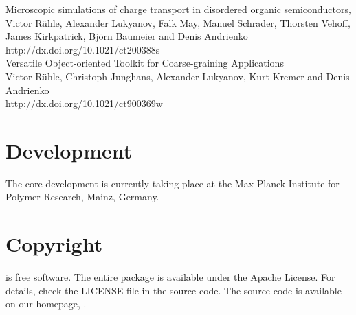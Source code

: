 \vspace{0.1cm}
\noindent
\cite{ruhle_microscopic_2011} Microscopic simulations of charge transport in disordered organic semiconductors, \\
Victor R\"uhle, Alexander Lukyanov, Falk May, Manuel Schrader, Thorsten Vehoff, James Kirkpatrick, Bj\"orn Baumeier and Denis Andrienko \\
{http://dx.doi.org/10.1021/ct200388s} \\

\vspace{0.1cm}
\noindent
\cite{ruhle_versatile_2009} Versatile Object-oriented Toolkit for Coarse-graining Applications \\
Victor R\"uhle, Christoph Junghans, Alexander Lukyanov, Kurt Kremer and Denis Andrienko \\
{http://dx.doi.org/10.1021/ct900369w}

\section*{Development}
The core development is currently taking place at the Max Planck Institute for Polymer Research, Mainz, Germany.

\section*{Copyright}
\votcactp is free software. The entire package is available under the Apache License. For details, check
the LICENSE file in the source code. The \votcactp source code is available on our homepage, .

\vfill
